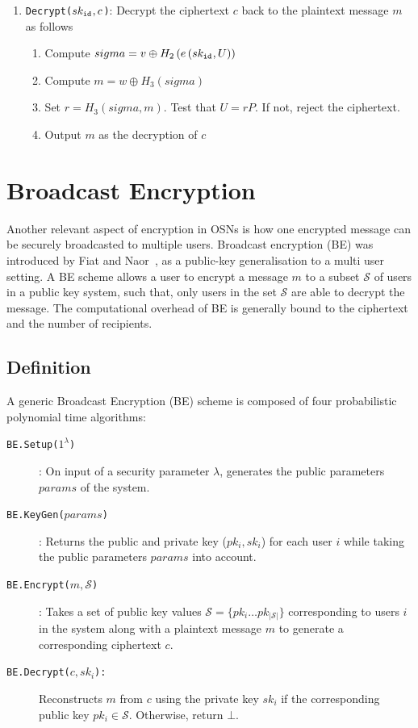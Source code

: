 \begin{algorithm}
\begin{enumerate}
\begin{enumerate}
   \end{enumerate}
   \item \texttt{Decrypt($sk_{\mathtt{id}_{}}, c$)}: Decrypt the ciphertext $c$ back to the plaintext message $m$ as follows
   \begin{enumerate}
    \item Compute $sigma = v \oplus H_2 \left( e \left( sk_{\mathtt{id}_{}}, U \right) \right)$
    \item Compute $m = w \oplus H_3 \left( sigma \right)$
    \item Set $r = H_3 \left( sigma, m \right)$. Test that $U = rP$. If not, reject the ciphertext.
    \item Output $m$ as the decryption of $c$
    \end{enumerate}
 \end{enumerate}
\end{algorithm}



\section{Broadcast Encryption}
Another relevant aspect of encryption in OSNs is how one encrypted message can be securely broadcasted to multiple users. Broadcast encryption (BE) was introduced by Fiat and Naor~\cite{art:FiatN93}, as a public-key generalisation to a multi user setting. A BE scheme allows a user to encrypt a message $m$ to a subset $\mathcal{S}$ of users in a public key system, such that, only users in the set $\mathcal{S}$ are able to decrypt the message. The computational overhead of BE is generally bound to the ciphertext and the number of recipients.

\subsection{Definition}
A generic Broadcast Encryption (BE) scheme is composed of four probabilistic polynomial time algorithms:

\begin{description}
    \item[\texttt{BE.Setup($1^{\lambda}$)}]: On input of a security parameter $\lambda$, generates the public parameters $params$ of the system.
    \item[\texttt{BE.KeyGen($params$)}]: Returns the public and private key ($pk_i,sk_i$) for each user $i$ while taking the public parameters $params$ into account.
    \item[\texttt{BE.Encrypt($m, \mathcal{S}$)}]: Takes a set of public key values $\mathcal{S}=\{pk_i \ldots pk_{|\mathcal{S}|}\}$ corresponding to users $i$ in the system along with a plaintext message $m$ to generate a corresponding ciphertext $c$.
    \item[\texttt{BE.Decrypt($c, sk_i$):}] Reconstructs $m$ from $c$ using the private key $sk_i$ if the corresponding public key $pk_i \in \mathcal{S}$. Otherwise, return $\bot$.
\end{description}

